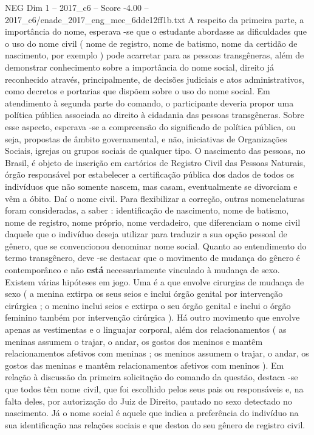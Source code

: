 \begin{textsample}{NEG Dim 1 – 2017\_c6 – Score -4.00 – 2017\_c6/enade\_2017\_eng\_mec\_6ddc12ff1b.txt}
A respeito da primeira parte, a importância do nome, esperava -se que o estudante abordasse as dificuldades que o uso do nome civil ( nome de registro, nome de batismo, nome da certidão de nascimento, por exemplo ) pode acarretar para as pessoas transgêneras, além de demonstrar conhecimento sobre a importância do nome social, direito já reconhecido através, principalmente, de decisões judiciais e atos administrativos, como decretos e portarias que dispõem sobre o uso do nome social.
Em atendimento à segunda parte do comando, o participante deveria propor uma política pública associada ao direito à cidadania das pessoas transgêneras.
Sobre esse aspecto, esperava -se a compreensão do significado de política pública, ou seja, propostas de âmbito governamental, e não, iniciativas de Organizações Sociais, igrejas ou grupos sociais de qualquer tipo.
O nascimento das pessoas, no Brasil, é objeto de inscrição em cartórios de Registro Civil das Pessoas Naturais, órgão responsável por estabelecer a certificação pública dos dados de todos os indivíduos que não somente nascem, mas casam, eventualmente se divorciam e vêm a óbito.
Daí o nome civil.
Para flexibilizar a correção, outras nomenclaturas foram consideradas, a saber : identificação de nascimento, nome de batismo, nome de registro, nome próprio, nome verdadeiro, que diferenciam o nome civil daquele que o indivíduo deseja utilizar para traduzir a sua opção pessoal de gênero, que se convencionou denominar nome social.
Quanto ao entendimento do termo transgênero, deve -se destacar que o movimento de mudança do gênero é contemporâneo e não \textbf{está} necessariamente vinculado à mudança de sexo.
Existem várias hipóteses em jogo.
Uma é a que envolve cirurgias de mudança de sexo ( a menina extirpa os seus seios e inclui órgão genital por intervenção cirúrgica ; o menino inclui seios e extirpa o seu órgão genital e inclui o órgão feminino também por intervenção cirúrgica ).
Há outro movimento que envolve apenas as vestimentas e o linguajar corporal, além dos relacionamentos ( as meninas assumem o trajar, o andar, os gostos dos meninos e mantêm relacionamentos afetivos com meninas ; os meninos assumem o trajar, o andar, os gostos das meninas e mantêm relacionamentos afetivos com meninos ).
Em relação à discussão da primeira solicitação do comando da questão, destaca -se que todos têm nome civil, que foi escolhido pelos seus pais ou responsáveis e, na falta deles, por autorização do Juiz de Direito, pautado no sexo detectado no nascimento.
Já o nome social é aquele que indica a preferência do indivíduo na sua identificação nas relações sociais e que destoa do seu gênero de registro civil.

\end{textsample}
